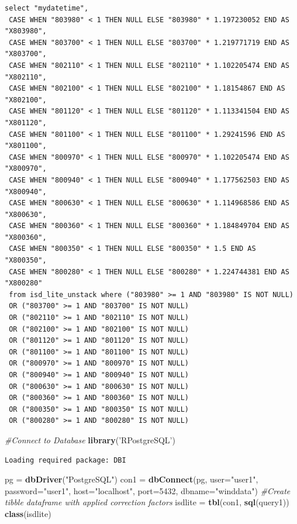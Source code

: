 \documentclass[12pt,twoside]{reedthesis}
\newenvironment{Shaded}{\begin{snugshade}}{\end{snugshade}}
\newcommand{\CommentTok}[1]{\textcolor[rgb]{0.56,0.35,0.01}{\textit{#1}}}
\newcommand{\DataTypeTok}[1]{\textcolor[rgb]{0.13,0.29,0.53}{#1}}
\newcommand{\DecValTok}[1]{\textcolor[rgb]{0.00,0.00,0.81}{#1}}
\newcommand{\KeywordTok}[1]{\textcolor[rgb]{0.13,0.29,0.53}{\textbf{#1}}}
\newcommand{\NormalTok}[1]{#1}
\newcommand{\StringTok}[1]{\textcolor[rgb]{0.31,0.60,0.02}{#1}}
\begin{document}
\begin{verbatim}
select "mydatetime", 
 CASE WHEN "803980" < 1 THEN NULL ELSE "803980" * 1.197230052 END AS "X803980", 
 CASE WHEN "803700" < 1 THEN NULL ELSE "803700" * 1.219771719 END AS "X803700", 
 CASE WHEN "802110" < 1 THEN NULL ELSE "802110" * 1.102205474 END AS "X802110", 
 CASE WHEN "802100" < 1 THEN NULL ELSE "802100" * 1.18154867 END AS "X802100", 
 CASE WHEN "801120" < 1 THEN NULL ELSE "801120" * 1.113341504 END AS "X801120", 
 CASE WHEN "801100" < 1 THEN NULL ELSE "801100" * 1.29241596 END AS "X801100", 
 CASE WHEN "800970" < 1 THEN NULL ELSE "800970" * 1.102205474 END AS "X800970", 
 CASE WHEN "800940" < 1 THEN NULL ELSE "800940" * 1.177562503 END AS "X800940", 
 CASE WHEN "800630" < 1 THEN NULL ELSE "800630" * 1.114968586 END AS "X800630", 
 CASE WHEN "800360" < 1 THEN NULL ELSE "800360" * 1.184849704 END AS "X800360", 
 CASE WHEN "800350" < 1 THEN NULL ELSE "800350" * 1.5 END AS "X800350", 
 CASE WHEN "800280" < 1 THEN NULL ELSE "800280" * 1.224744381 END AS "X800280" 
 from isd_lite_unstack where ("803980" >= 1 AND "803980" IS NOT NULL) 
 OR ("803700" >= 1 AND "803700" IS NOT NULL) 
 OR ("802110" >= 1 AND "802110" IS NOT NULL) 
 OR ("802100" >= 1 AND "802100" IS NOT NULL) 
 OR ("801120" >= 1 AND "801120" IS NOT NULL) 
 OR ("801100" >= 1 AND "801100" IS NOT NULL) 
 OR ("800970" >= 1 AND "800970" IS NOT NULL) 
 OR ("800940" >= 1 AND "800940" IS NOT NULL) 
 OR ("800630" >= 1 AND "800630" IS NOT NULL) 
 OR ("800360" >= 1 AND "800360" IS NOT NULL) 
 OR ("800350" >= 1 AND "800350" IS NOT NULL) 
 OR ("800280" >= 1 AND "800280" IS NOT NULL)
\end{verbatim}
\vspace{0.4cm}
\begin{Shaded}
\begin{Highlighting}[]
    \CommentTok{#Connect to Database}
      \KeywordTok{library}\NormalTok{(}\StringTok{'RPostgreSQL'}\NormalTok{)}
\end{Highlighting}
\end{Shaded}
\begin{verbatim}
Loading required package: DBI
\end{verbatim}
\vspace{0.4cm}
\begin{Shaded}
\begin{Highlighting}[]
\NormalTok{      pg =}\StringTok{ }\KeywordTok{dbDriver}\NormalTok{(}\StringTok{"PostgreSQL"}\NormalTok{)}
\NormalTok{      con1 =}\StringTok{ }\KeywordTok{dbConnect}\NormalTok{(pg, }\DataTypeTok{user=}\StringTok{"user1"}\NormalTok{, }\DataTypeTok{password=}\StringTok{"user1"}\NormalTok{, }\DataTypeTok{host=}\StringTok{"localhost"}\NormalTok{, }\DataTypeTok{port=}\DecValTok{5432}\NormalTok{, }\DataTypeTok{dbname=}\StringTok{"winddata"}\NormalTok{)}
    \CommentTok{#Create tibble dataframe with applied correction factors}
\NormalTok{      isdlite =}\StringTok{ }\KeywordTok{tbl}\NormalTok{(con1, }\KeywordTok{sql}\NormalTok{(query1))}
      \KeywordTok{class}\NormalTok{(isdlite)}
\end{Highlighting}
\end{Shaded}
\end{document}
